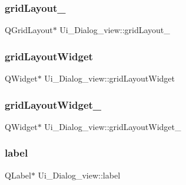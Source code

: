 \subsubsection{\texorpdfstring{grid\+Layout\+\_}{gridLayout\_2}}
{\footnotesize\ttfamily Q\+Grid\+Layout$\ast$ Ui\+\_\+\+Dialog\+\_\+view\+::grid\+Layout\+\_}

\hypertarget{class_ui___dialog__view_a0e98ef3e72073f15b6280ca2537d81ab}{}\label{class_ui___dialog__view_a0e98ef3e72073f15b6280ca2537d81ab} 
\subsubsection{\texorpdfstring{grid\+Layout\+Widget}{gridLayoutWidget}}
{\footnotesize\ttfamily Q\+Widget$\ast$ Ui\+\_\+\+Dialog\+\_\+view\+::grid\+Layout\+Widget}

\hypertarget{class_ui___dialog__view_aa6d06ff1a4eae6c50829603637aa6ca8}{}\label{class_ui___dialog__view_aa6d06ff1a4eae6c50829603637aa6ca8} 
\subsubsection{\texorpdfstring{grid\+Layout\+Widget\+\_}{gridLayoutWidget\_2}}
{\footnotesize\ttfamily Q\+Widget$\ast$ Ui\+\_\+\+Dialog\+\_\+view\+::grid\+Layout\+Widget\+\_}

\hypertarget{class_ui___dialog__view_a7707206ee512ad1f786ed09affc4eb4d}{}\label{class_ui___dialog__view_a7707206ee512ad1f786ed09affc4eb4d} 
\subsubsection{\texorpdfstring{label}{label}}
{\footnotesize\ttfamily Q\+Label$\ast$ Ui\+\_\+\+Dialog\+\_\+view\+::label}

\hypertarget{class_ui___dialog__view_a504f628127fabf2128d41b30b41fb6b8}{}\label{class_ui___dialog__view_a504f628127fabf2128d41b30b41fb6b8} 
